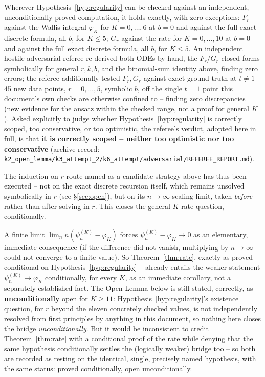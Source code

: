 \documentclass[11pt]{article}
\theoremstyle{remark}
\begin{document}
Wherever Hypothesis~\ref{hyp:regularity} can be checked against an
independent, unconditionally proved computation, it holds exactly, with
zero exceptions: $F_r$ against the Wallis integral $\varphi_K$ for
$K=0,\dots,6$ at $b=0$ and against the full exact discrete formula, all
$b$, for $K\le5$; $G_r$ against the rate for $K=0,\dots,10$ at $b=0$ and
against the full exact discrete formula, all $b$, for $K\le5$. An
independent hostile adversarial referee re-derived both ODEs by hand,
the $F_r$/$G_r$ closed forms symbolically for general $r,k,b$, and the
binomial-sum identity above, finding zero errors; the referee
additionally tested $F_r,G_r$ against exact ground truth at $t\ne1$ --
45 new data points, $r=0,\dots,5$, symbolic $b$, off the single $t=1$
point this document's own checks are otherwise confined to -- finding
zero discrepancies (new evidence for the ansatz within the checked
range, not a proof for general $K$). Asked explicitly to judge whether
Hypothesis~\ref{hyp:regularity} is correctly scoped, too conservative,
or too optimistic, the referee's verdict, adopted here in full, is that
\textbf{it is correctly scoped -- neither too optimistic nor too
conservative} (archive record:
\texttt{k2\_open\_lemma/k3\_attempt\_2/k6\_attempt/adversarial/}\allowbreak\texttt{REFEREE\_REPORT.md}).

The induction-on-$r$ route named as a candidate strategy above has thus
been executed -- not on the exact discrete recursion itself, which
remains unsolved symbolically in $r$ (see \S\ref{sec:open}), but on its
$n\to\infty$ scaling limit, taken \emph{before} rather than after
solving in $r$. This closes the general-$K$ rate question, conditionally.

A finite limit $\lim_n n(\psi_n^{(K)}-\varphi_K)$ forces
$\psi_n^{(K)}-\varphi_K\to0$ as an elementary, immediate consequence
(if the difference did not vanish, multiplying by $n\to\infty$ could not
converge to a finite value). So Theorem~\ref{thm:rate}, exactly as
proved -- conditional on Hypothesis~\ref{hyp:regularity} -- already
entails the weaker statement $\psi_n^{(K)}\to\varphi_K$ conditionally,
for every $K$, as an immediate corollary, not a separately established
fact. The Open Lemma below is still stated, correctly, as
\textbf{unconditionally} open for $K\ge11$: Hypothesis~\ref{hyp:regularity}'s
existence question, for $r$ beyond the eleven concretely checked values,
is not independently resolved from first principles by anything in this
document, so nothing here closes the bridge \emph{unconditionally}. But
it would be inconsistent to credit Theorem~\ref{thm:rate} with a
conditional proof of the rate while denying that the same hypothesis
conditionally settles the (logically weaker) bridge too -- so both are
recorded as resting on the identical, single, precisely named
hypothesis, with the same status: proved conditionally, open
unconditionally.
\end{document}
